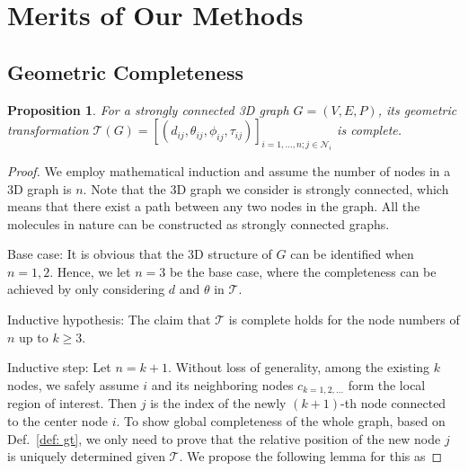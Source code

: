 \documentclass{article}
\newtheorem{prop}{Proposition}
\begin{document}
\section{Merits of Our Methods} \label{sec:merits}

\subsection{Geometric Completeness}  \label{sec:comp}


\begin{prop}
For a strongly connected 3D graph $G=(V,E,P)$, its geometric transformation
$\mathcal{T}(G)=[(d_{ij},\theta_{ij},\phi_{ij}, \tau_{ij})]_{i=1,...,n; j\in \mathcal{N}_i}$
is complete.
\label{theorem1}
\end{prop}

\begin{proof}
\vspace{-5 pt}
We employ mathematical induction and assume the number of nodes in a 3D graph is $n$.
\textcolor{COLOR}{Note that the 3D graph we consider is strongly connected, which means that there exist a path between any two nodes in the graph. All the molecules in nature can be constructed as strongly connected graphs.}

Base case: It is obvious that the 3D structure of $G$ can be identified when $n=1,2$.
Hence, we let $n=3$ be the base case, where the completeness can be achieved by only considering $d$ and $\theta$ in $\mathcal{T}$.

Inductive hypothesis: The claim that $\mathcal{T}$ is complete holds for the node numbers of $n$ up to $k\geq3$.

Inductive step: Let $n=k+1$. Without loss of generality, among the existing $k$ nodes, we safely assume $i$ and 
its neighboring nodes $c_{k = 1,2,...}$ form the local region of interest.
Then $j$ is the index of the newly $(k+1)$-th node connected to the center node $i$.
To show global completeness of the whole graph, based on Def.~\ref{def: gt},
we only need to prove that the relative position of the new node $j$ is uniquely determined given
$\mathcal{T}$.
We propose the following lemma for this as


\end{proof}
\end{document}

